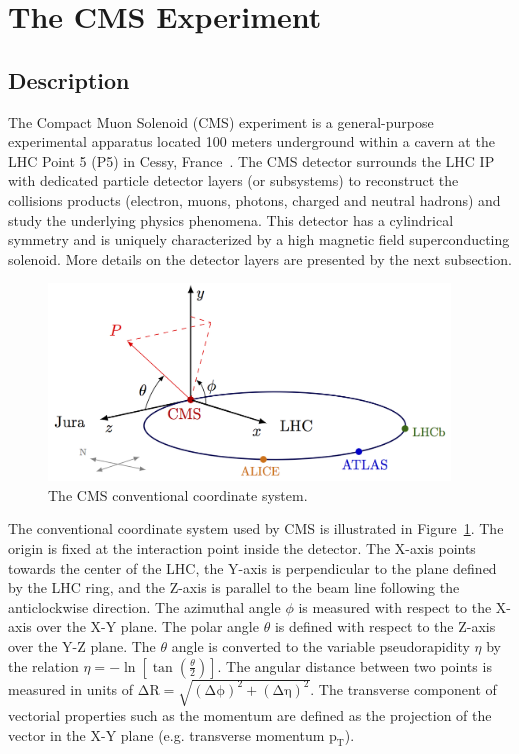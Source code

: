 \section{The CMS Experiment}
\subsection{Description}
The Compact Muon Solenoid (CMS) experiment is a general-purpose experimental apparatus located 100 meters underground within a cavern at the LHC Point 5 (P5) in Cessy, France~\cite{CMS:2008xjf}. The CMS detector surrounds the LHC IP with dedicated particle detector layers (or subsystems) to reconstruct the collisions products (electron, muons, photons, charged and neutral hadrons) and study the underlying physics phenomena. This detector has a cylindrical symmetry and is uniquely characterized by a high magnetic field superconducting solenoid. More details on the detector layers are presented by the next subsection.

\begin{figure}[htp!]
\centering
\includegraphics[width=0.95\textwidth]{Figures/Apparatus/cms_coordinate_system.png}
\caption[The CMS conventional coordinate system]{The CMS conventional coordinate system.}
\label{fig:coordinates}
\end{figure}

The conventional coordinate system used by CMS is illustrated in Figure~\ref{fig:coordinates}. The origin is fixed at the interaction point inside the detector. The X-axis points towards the center of the LHC, the Y-axis is perpendicular to the plane defined by the LHC ring, and the Z-axis is parallel to the beam line following the anticlockwise direction. The azimuthal angle $\phi$ is measured with respect to the X-axis over the X-Y plane. The polar angle $\theta$ is defined with respect to the Z-axis over the Y-Z plane.  The
$\theta$ angle is converted to the variable pseudorapidity $\eta$ by the relation $\eta=-\ln{[\tan{(\frac{\theta}{2}) }]}$. The angular distance between two points is measured in units of $\mathrm{\Delta R=\sqrt{ (\Delta\phi)^{2} + (\Delta\eta)^{2} }}$. The transverse component of vectorial properties such as the momentum are defined as the projection of the vector in the X-Y plane (e.g. transverse momentum $\mathrm{p_{T}}$). 

